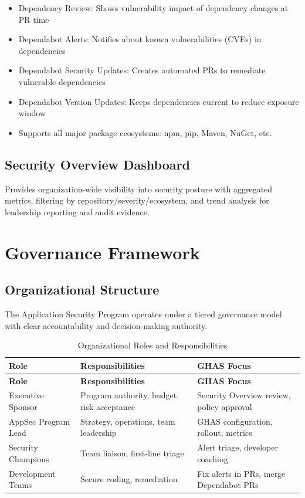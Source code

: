 \documentclass[11pt]{article}
\begin{document}
\begin{itemize}[leftmargin=*]
\item Dependency Review: Shows vulnerability impact of dependency changes at PR time
\item Dependabot Alerts: Notifies about known vulnerabilities (CVEs) in dependencies
\item Dependabot Security Updates: Creates automated PRs to remediate vulnerable dependencies
\item Dependabot Version Updates: Keeps dependencies current to reduce exposure window
\item Supports all major package ecosystems: npm, pip, Maven, NuGet, etc.
\end{itemize}
\subsection{Security Overview Dashboard}

Provides organization-wide visibility into security posture with aggregated metrics, filtering by repository/severity/ecosystem, and trend analysis for leadership reporting and audit evidence.

\section{Governance Framework}

\subsection{Organizational Structure}

The Application Security Program operates under a tiered governance model with clear accountability and decision-making authority.

\begin{longtable}{@{}>{\RaggedRight\arraybackslash}p{}>{\RaggedRight\arraybackslash}p{}>{\RaggedRight\arraybackslash}p{}@{}}
\caption{Organizational Roles and Responsibilities}\label{tab:org_roles}\\
\toprule
\textbf{Role} & \textbf{Responsibilities} & \textbf{GHAS Focus} \\
\midrule
\endfirsthead
\toprule
\textbf{Role} & \textbf{Responsibilities} & \textbf{GHAS Focus} \\
\midrule
\endhead
\bottomrule
\endfoot
Executive Sponsor & Program authority, budget, risk acceptance & Security Overview review, policy approval \\
AppSec Program Lead & Strategy, operations, team leadership & GHAS configuration, rollout, metrics \\
Security Champions & Team liaison, first-line triage & Alert triage, developer coaching \\
Development Teams & Secure coding, remediation & Fix alerts in PRs, merge Dependabot PRs \\
\end{longtable}
\end{document}

